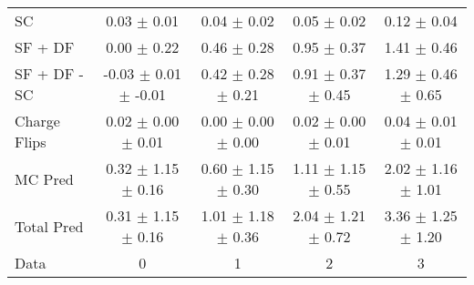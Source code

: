 \begin{tabular}{l|cccc}
                                 SC &  0.03 $\pm$  0.01 &  0.04 $\pm$  0.02 &  0.05 $\pm$  0.02 &  0.12 $\pm$  0.04 \\
                            SF + DF &  0.00 $\pm$  0.22 &  0.46 $\pm$  0.28 &  0.95 $\pm$  0.37 &  1.41 $\pm$  0.46 \\
\hline
                       SF + DF - SC & -0.03 $\pm$  0.01 $\pm$ -0.01 &  0.42 $\pm$  0.28 $\pm$  0.21 &  0.91 $\pm$  0.37 $\pm$  0.45 &  1.29 $\pm$  0.46 $\pm$  0.65 \\
\hline\hline
                       Charge Flips &  0.02 $\pm$  0.00 $\pm$  0.01 &  0.00 $\pm$  0.00 $\pm$  0.00 &  0.02 $\pm$  0.00 $\pm$  0.01 &  0.04 $\pm$  0.01 $\pm$  0.01 \\
\hline
                            MC Pred &  0.32 $\pm$  1.15 $\pm$  0.16 &  0.60 $\pm$  1.15 $\pm$  0.30 &  1.11 $\pm$  1.15 $\pm$  0.55 &  2.02 $\pm$  1.16 $\pm$  1.01 \\
\hline
                         Total Pred &  0.31 $\pm$  1.15 $\pm$  0.16 &  1.01 $\pm$  1.18 $\pm$  0.36 &  2.04 $\pm$  1.21 $\pm$  0.72 &  3.36 $\pm$  1.25 $\pm$  1.20 \\
\hline\hline
                               Data &     0 &     1 &     2 &     3 \\
\hline\hline
\end{tabular}

